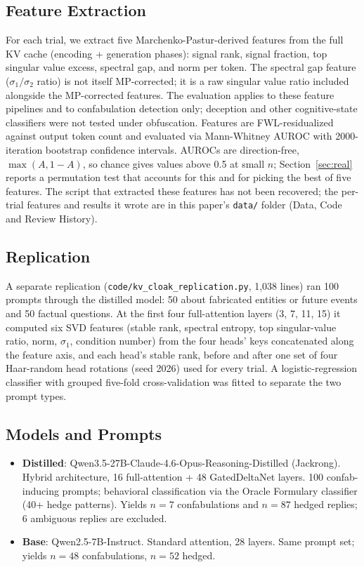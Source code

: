 \subsection{Feature Extraction}

For each trial, we extract five Marchenko-Pastur-derived features from
the full KV cache (encoding + generation phases): signal rank, signal
fraction, top singular value excess, spectral gap, and norm per token.
The spectral gap feature ($\sigma_1/\sigma_2$ ratio) is not itself
MP-corrected; it is a raw singular value ratio included alongside the
MP-corrected features. The evaluation applies to these feature pipelines
and to confabulation detection only; deception and other cognitive-state
classifiers were not tested under obfuscation.
Features are FWL-residualized \citep{frisch1933partial,lovell1963seasonal} against output token count and evaluated
via Mann-Whitney AUROC with 2000-iteration bootstrap confidence
intervals. AUROCs are direction-free, $\max(A, 1-A)$, so chance gives
values above 0.5 at small $n$; Section~\ref{sec:real} reports a
permutation test that accounts for this and for picking the best of five
features. The script that extracted these features has not been
recovered; the per-trial features and results it wrote are in this
paper's \texttt{data/} folder (Data, Code and Review History).

\subsection{Replication}
\label{sec:method_rep}

A separate replication (\texttt{code/kv\_cloak\_replication.py},
1,038 lines) ran 100 prompts through the distilled model: 50 about
fabricated entities or future events and 50 factual questions. At the
first four full-attention layers (3, 7, 11, 15) it computed six SVD
features (stable rank, spectral entropy, top singular-value ratio, norm,
$\sigma_1$, condition number) from the four heads' keys concatenated along
the feature axis, and each head's stable rank, before and after one set of
four Haar-random head rotations (seed 2026) used for every trial. A
logistic-regression classifier with grouped five-fold cross-validation was
fitted to separate the two prompt types.

\subsection{Models and Prompts}

\begin{itemize}
\item \textbf{Distilled}: Qwen3.5-27B-Claude-4.6-Opus-Reasoning-Distilled
(Jackrong). Hybrid architecture, 16 full-attention + 48 GatedDeltaNet
layers. 100 confab-inducing prompts; behavioral classification via the
Oracle Formulary classifier (40+ hedge patterns). Yields $n=7$
confabulations and $n=87$ hedged replies; 6 ambiguous replies are
excluded.

\item \textbf{Base}: Qwen2.5-7B-Instruct. Standard attention, 28
layers. Same prompt set; yields $n=48$ confabulations, $n=52$ hedged.
\end{itemize}

